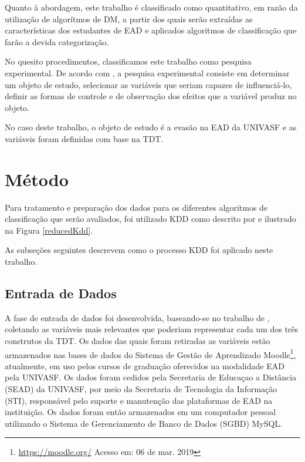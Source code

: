 Quanto à abordagem, este trabalho é classificado como quantitativo, em razão da
utilização de algorítmos de DM, a partir dos quais serão extraídas as
características dos estudantes de EAD e aplicados algoritmos de classificação
que farão a devida categorização.

No quesito procedimentos, classificamos este trabalho como pesquisa
experimental. De acordo com , a pesquisa
experimental consiste em determinar um objeto de estudo, selecionar as variáveis
que seriam capazes de influenciá-lo, definir as formas de controle e de
observação dos efeitos que a variável produz no objeto.

No caso deste trabalho, o objeto de estudo é a evasão na EAD da UNIVASF e as
variáveis foram definidas com base na TDT.

\section{Método}

Para tratamento e preparação dos dados para os diferentes algoritmos de
classificação que serão avaliados, foi utilizado KDD como descrito por
 e ilustrado na Figura \ref{reducedKdd}.


As subseções seguintes descrevem como o processo KDD foi aplicado neste
trabalho.

\subsection{Entrada de Dados}

A fase de entrada de dados foi desenvolvida, baseando-se no trabalho de
, coletando as variáveis mais relevantes que
poderiam representar cada um dos três construtos da TDT. Os dados das quais
foram retiradas as variáveis estão armazenados nas bases de dados do Sistema de
Gestão de Aprendizado Moodle\footnote{\url{https://moodle.org/} Acesso em: 06 de
mar. 2019}, atualmente, em uso pelos cursos de graduação oferecidos na
modalidade EAD pela UNIVASF. Os dados foram cedidos pela Secretaria de Educaçao
a Distância (SEAD) da UNIVASF, por meio da Secretaria de Tecnologia da
Informação (STI), responsável pelo suporte e manutenção das plataformas de EAD
na instituição. Os dados foram então armazenados em um computador pessoal
utilizando o Sistema de Gerenciamento de Banco de Dados (SGBD) MySQL.

